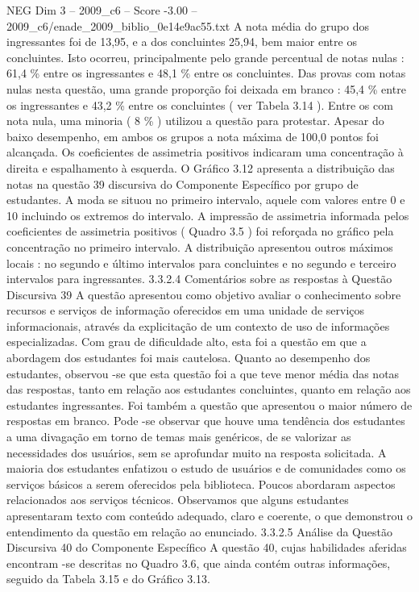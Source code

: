 \begin{textsample}{NEG Dim 3 – 2009\_c6 – Score -3.00 – 2009\_c6/enade\_2009\_biblio\_0e14e9ac55.txt}
A nota média do grupo dos ingressantes foi de 13,95, e a dos concluintes 25,94, bem maior entre os concluintes.
Isto ocorreu, principalmente pelo grande percentual de notas nulas : 61,4 \% entre os ingressantes e 48,1 \% entre os concluintes.
Das provas com notas nulas nesta questão, uma grande proporção foi deixada em branco : 45,4 \% entre os ingressantes e 43,2 \% entre os concluintes ( ver Tabela 3.14 ).
Entre os com nota nula, uma minoria ( 8 \% ) utilizou a questão para protestar.
Apesar do baixo desempenho, em ambos os grupos a nota máxima de 100,0 pontos foi alcançada.
Os coeficientes de assimetria positivos indicaram uma concentração à direita e espalhamento à esquerda.
O Gráfico 3.12 apresenta a distribuição das notas na questão 39 discursiva do Componente Específico por grupo de estudantes.
A moda se situou no primeiro intervalo, aquele com valores entre 0 e 10 incluindo os extremos do intervalo.
A impressão de assimetria informada pelos coeficientes de assimetria positivos ( Quadro 3.5 ) foi reforçada no gráfico pela concentração no primeiro intervalo.
A distribuição apresentou outros máximos locais : no segundo e último intervalos para concluintes e no segundo e terceiro intervalos para ingressantes. 3.3.2.4 Comentários sobre as respostas à Questão Discursiva 39 A questão apresentou como objetivo avaliar o conhecimento sobre recursos e serviços de informação oferecidos em uma unidade de serviços informacionais, através da explicitação de um contexto de uso de informações especializadas.
Com grau de dificuldade alto, esta foi a questão em que a abordagem dos estudantes foi mais cautelosa.
Quanto ao desempenho dos estudantes, observou -se que esta questão foi a que teve menor média das notas das respostas, tanto em relação aos estudantes concluintes, quanto em relação aos estudantes ingressantes.
Foi também a questão que apresentou o maior número de respostas em branco.
Pode -se observar que houve uma tendência dos estudantes a uma divagação em torno de temas mais genéricos, de se valorizar as necessidades dos usuários, sem se aprofundar muito na resposta solicitada.
A maioria dos estudantes enfatizou o estudo de usuários e de comunidades como os serviços básicos a serem oferecidos pela biblioteca.
Poucos abordaram aspectos relacionados aos serviços técnicos.
Observamos que alguns estudantes apresentaram texto com conteúdo adequado, claro e coerente, o que demonstrou o entendimento da questão em relação ao enunciado. 3.3.2.5 Análise da Questão Discursiva 40 do Componente Específico A questão 40, cujas habilidades aferidas encontram -se descritas no Quadro 3.6, que ainda contém outras informações, seguido da Tabela 3.15 e do Gráfico 3.13.

\end{textsample}
